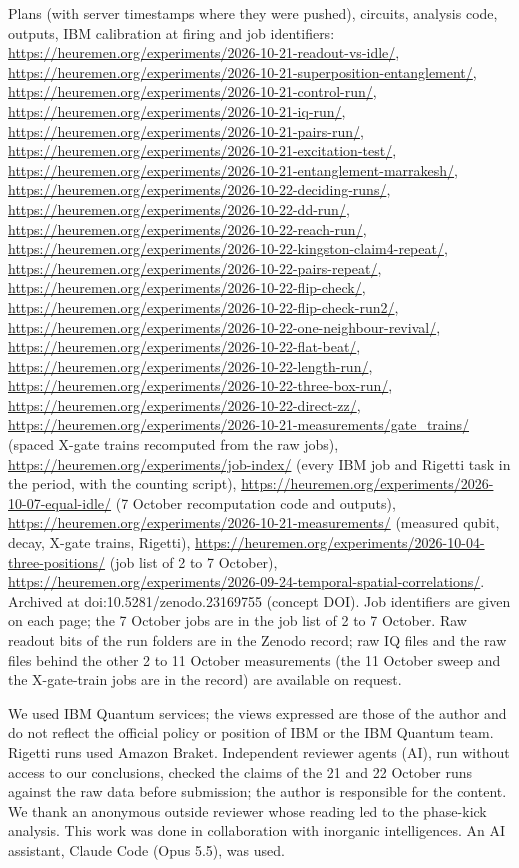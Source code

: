 \documentclass[reprint,amsmath,amssymb,aps,superscriptaddress,nofootinbib]{revtex4-2}
\begin{document}
Plans (with server timestamps where they were pushed), circuits, analysis code, outputs, IBM calibration at firing and job identifiers: \url{https://heuremen.org/experiments/2026-10-21-readout-vs-idle/}, \url{https://heuremen.org/experiments/2026-10-21-superposition-entanglement/}, \url{https://heuremen.org/experiments/2026-10-21-control-run/}, \url{https://heuremen.org/experiments/2026-10-21-iq-run/}, \url{https://heuremen.org/experiments/2026-10-21-pairs-run/}, \url{https://heuremen.org/experiments/2026-10-21-excitation-test/}, \url{https://heuremen.org/experiments/2026-10-21-entanglement-marrakesh/}, \url{https://heuremen.org/experiments/2026-10-22-deciding-runs/}, \url{https://heuremen.org/experiments/2026-10-22-dd-run/}, \url{https://heuremen.org/experiments/2026-10-22-reach-run/}, \url{https://heuremen.org/experiments/2026-10-22-kingston-claim4-repeat/}, \url{https://heuremen.org/experiments/2026-10-22-pairs-repeat/}, \url{https://heuremen.org/experiments/2026-10-22-flip-check/}, \url{https://heuremen.org/experiments/2026-10-22-flip-check-run2/}, \url{https://heuremen.org/experiments/2026-10-22-one-neighbour-revival/}, \url{https://heuremen.org/experiments/2026-10-22-flat-beat/}, \url{https://heuremen.org/experiments/2026-10-22-length-run/}, \url{https://heuremen.org/experiments/2026-10-22-three-box-run/}, \url{https://heuremen.org/experiments/2026-10-22-direct-zz/}, \url{https://heuremen.org/experiments/2026-10-21-measurements/gate_trains/} (spaced X-gate trains recomputed from the raw jobs), \url{https://heuremen.org/experiments/job-index/} (every IBM job and Rigetti task in the period, with the counting script), \url{https://heuremen.org/experiments/2026-10-07-equal-idle/} (7 October recomputation code and outputs), \url{https://heuremen.org/experiments/2026-10-21-measurements/} (measured qubit, decay, X-gate trains, Rigetti), \url{https://heuremen.org/experiments/2026-10-04-three-positions/} (job list of 2 to 7 October), \url{https://heuremen.org/experiments/2026-09-24-temporal-spatial-correlations/}. Archived at doi:10.5281/zenodo.23169755 (concept DOI). Job identifiers are given on each page; the 7 October jobs are in the job list of 2 to 7 October. Raw readout bits of the run folders are in the Zenodo record; raw IQ files and the raw files behind the other 2 to 11 October measurements (the 11 October sweep and the X-gate-train jobs are in the record) are available on request.

\begin{acknowledgments}
We used IBM Quantum services; the views expressed are those of the author and do not reflect the official policy or position of IBM or the IBM Quantum team. Rigetti runs used Amazon Braket. Independent reviewer agents (AI), run without access to our conclusions, checked the claims of the 21 and 22 October runs against the raw data before submission; the author is responsible for the content. We thank an anonymous outside reviewer whose reading led to the phase-kick analysis. This work was done in collaboration with inorganic intelligences. An AI assistant, Claude Code (Opus 5.5), was used.
\end{acknowledgments}


\end{document}
